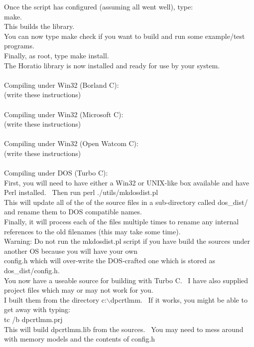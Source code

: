\documentclass{article}
\begin{document}
Once the script has configured
(assuming all went well), type:\\
make.\\
This builds the library.\\
You can now type make check if you
want to build and run some
example/test programs.\\
Finally, as root, type make
install.\\
The Horatio library is now
installed and ready for use by your system.\\
\\
Compiling under Win32 (Borland C):\\
(write these instructions)\\
\\
Compiling under Win32 (Microsoft C):\\
(write these instructions)\\
\\
Compiling under Win32 (Open Watcom C):\\
(write these instructions)\\
\\
Compiling under DOS (Turbo C):\\
First, you will need to have
either a Win32 or UNIX-like box available and have Perl
installed.~ Then run perl ./utils/mkdosdist.pl\\
This will update all of the of the source files in a sub-directory
called dos\_dist/ and rename them to DOS compatible names.\\
Finally, it will process each of the files multiple times to rename any
internal references to the old filenames (this may take some time).\\
Warning: Do not run the mkdosdist.pl script if you have build the
sources under another OS because you will have your own\\
config.h which will over-write the DOS-crafted one which is stored as
dos\_dist/config.h.\\
You now have a useable source for building with Turbo C.~ I have
also supplied project files which may or may not work for you.\\
I built them from the directory c:$\backslash$dpcrtlmm.~ If it works, you
might be able to get away with typing:\\
tc /b dpcrtlmm.prj\\
This will build dpcrtlmm.lib from the sources.~ You may need to
mess around with memory models and the contents of config.h\\
\end{document}
